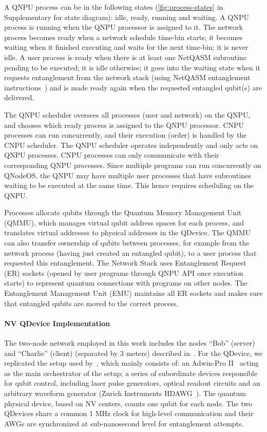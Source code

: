 A QNPU process can be in the following states (\cref{fig:process-states} in Supplementary for state diagram): idle, ready, running and waiting. A QNPU process is running when the QNPU processor is assigned to it. The network process becomes ready when a network schedule time-bin starts; it becomes waiting when it finished executing and waits for the next time-bin; it is never idle. A user process is ready when there is at least one NetQASM subroutine pending to be executed; it is idle otherwise; it goes into the waiting state when it requests entanglement from the network stack (using NetQASM entanglement instructions~\cite{dahlberg_2022_netqasm}) and is made ready again when the requested entangled qubit(s) are delivered. 

The QNPU scheduler oversees all processes (user and network) on the QNPU, and chooses which ready process is assigned to the QNPU processor. CNPU processes can run concurrently, and their execution (order) is handled by the CNPU scheduler. The QNPU scheduler operates independently and only acts on QNPU processes. CNPU processes can only communicate with their corresponding QNPU processes. Since multiple programs can run concurrently on QNodeOS, the QNPU may have multiple user processes that have subroutines waiting to be executed at the same time. This hence requires scheduling on the QNPU.

Processes allocate qubits through the Quantum Memory Management Unit (QMMU), which manages virtual qubit address spaces for each process, and translates virtual addresses to physical addresses in the QDevice. The QMMU can also transfer ownership of qubits between processes, for example from the network process (having just created an entangled qubit), to a user process that requested this entanglement. The Network Stack uses Entanglement Request (ER) sockets (opened by user programs through QNPU API once execution starts) to represent quantum connections with programs on other nodes. The Entanglement Management Unit (EMU) maintains all ER sockets and makes sure that entangled qubits are moved to the correct process.

\paragraph{NV QDevice Implementation}

The two-node network employed in this work includes the nodes “Bob” (server) and “Charlie” (client) (separated by 3 meters) described in~\cite{pompili_2021_multinode,hermans2022qubit,pompili_2022_experimental}. For the QDevice, we replicated the setup used by~\cite{pompili_2022_experimental}, which mainly consists of: an Adwin-Pro II~\cite{adwin} acting as the main orchestrator of the setup; a series of subordinate devices responsible for qubit control, including laser pulse generators, optical readout circuits and an arbitrary waveform generator (Zurich Instruments HDAWG~\cite{zurich_instruments_hdawg_2019}). The quantum physical device, based on NV centers, counts one qubit for each node. The two QDevices share a common 1 MHz clock for high-level communication and their AWGs are synchronized at sub-nanosecond level for entanglement attempts.

